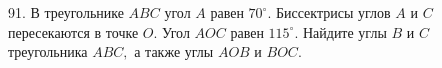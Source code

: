 91. В треугольнике $ABC$ угол $A$ равен $70^\circ.$ Биссектрисы углов $A$ и $C$ пересекаются в точке $O.$ Угол $AOC$ равен $115^\circ.$ Найдите углы $B$ и $C$ треугольника $ABC,$ а также углы $AOB$ и $BOC.$\\

